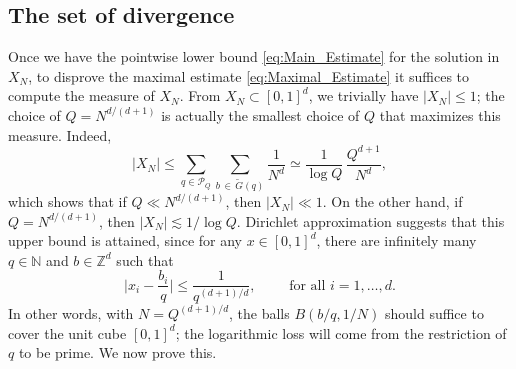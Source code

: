 \documentclass[11pt,reqno]{amsart}
\theoremstyle{definition}
\numberwithin{equation}{section}
\theoremstyle{remark}
\begin{document}
\subsection{The set of divergence}
Once we have the pointwise lower bound \eqref{eq:Main_Estimate} for the solution in $X_N$, 
to disprove the maximal estimate \eqref{eq:Maximal_Estimate} it suffices to compute the measure of $X_N$. 
From $X_N \subset [0,1]^d$, we trivially have $|X_N| \leq 1$;
the choice of $Q = N^{d/(d+1)}$ is actually the smallest choice of $Q$ that maximizes this measure.
Indeed,  
\begin{equation}\label{eq:Covering_Bound}
        |X_N| 
        \leq \sum_{q \in \mathcal P_Q} \sum_{ b \,  \in \, \widetilde G(q)} \frac{1}{N^d} 
        \simeq \frac{1}{\log Q} \, \frac{Q^{d+1}}{N^d},          
    \end{equation}
which shows that if $Q \ll N^{d/(d+1)}$, then $|X_N| \ll 1$. 
On the other hand, if $Q = N^{d/(d+1)}$, 
then $|X_N| \lesssim 1/\log Q$. 
Dirichlet approximation suggests that this upper bound is attained,
since for any $x \in [0,1]^d$, there are infinitely many $q \in \mathbb N$ and $b \in \mathbb Z^d$ such that 
    \begin{equation}\label{eq:Dirichlet_Approximation}
        \Big| x_i - \frac{b_i}{q} \Big| \leq \frac{1}{q^{(d+1)/d}}, \qquad \text{ for all } i = 1, \ldots, d. 
    \end{equation}
In other words, with $N = Q^{(d+1)/d}$, 
the balls $B(b/q, 1/N)$ should suffice to cover the unit cube $[0,1]^d$; the logarithmic loss will come from the restriction of $q$ to be prime. 
We now prove this. 
\end{document}

